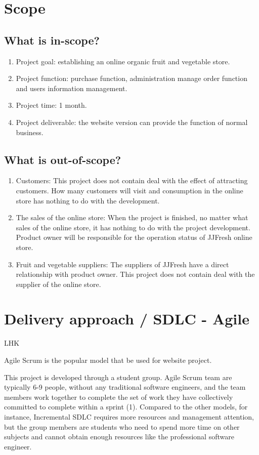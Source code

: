 \documentclass{report}
\begin{document}
\section{Scope}
\subsection{What is in-scope?}
\begin{enumerate}
  \item Project goal: establishing an online organic fruit and vegetable store.
  \item Project function: purchase function, administration manage order function and users information management.
  \item Project time: 1 month.
  \item Project deliverable: the website version can provide the function of normal business.
\end{enumerate}
\subsection{What is out-of-scope?}
\begin{enumerate}
  \item Customers: This project does not contain deal with the effect of attracting customers. How many customers will visit and consumption in the online store has nothing to do with the development.
  \item The sales of the online store: When the project is finished, no matter what sales of the online store, it has nothing to do with the project development. Product owner will be responsible for the operation status of JJFresh online store.
  \item Fruit and vegetable suppliers: The suppliers of JJFresh have a direct relationship with product owner. This project does not contain deal with the supplier of the online store.
\end{enumerate}
\section{Delivery approach / SDLC - Agile}
LHK

Agile Scrum is the popular model that be used for website project.

This project is developed through a student group. Agile Scrum team are typically 6-9 people, without any traditional software engineers, and the team members work together to complete the set of work they have collectively committed to complete within a sprint (1). Compared to the other models, for instance, Incremental SDLC requires more resources and management attention, but the group members are students who need to spend more time on other subjects and cannot obtain enough resources like the professional software engineer.
\end{document}
